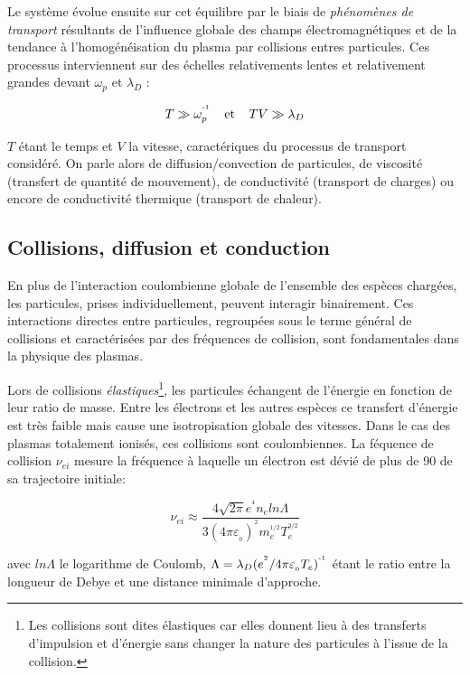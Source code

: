 Le système évolue ensuite sur cet équilibre par le biais de
\emph{phénomènes de transport} résultants de l'influence
globale des champs électromagnétiques et de la tendance à
l'homogénéisation du plasma par collisions entres particules.
Ces processus interviennent sur des échelles relativements
lentes et relativement grandes devant $\omega_p$ et $\lambda_D$ :

\begin{equation}
T\gg \omega_p^{\operatorname{^{-1}}} \;\;\;\;\text{et}\;\;\;\;T V\gg\lambda_D
\end{equation}

$T$ étant le temps et $V$ la vitesse, caractériques du processus de transport
considéré.
On parle alors de diffusion/convection de particules, de viscosité (transfert de
quantité de mouvement), de conductivité (transport de charges) ou encore de
conductivité thermique (transport de chaleur).

\subsection{Collisions, diffusion et conduction}
En plus de l'interaction coulombienne globale de l'ensemble des espèces chargées, 
les particules, prises individuellement, peuvent interagir binairement. 
Ces interactions directes entre particules, regroupées
sous le terme général de collisions et caractérisées par des fréquences de collision, 
sont fondamentales dans la physique des plasmas.

Lors de collisions \emph{élastiques}\footnote{Les collisions sont dites élastiques car
elles donnent lieu à des transferts d'impulsion et d'énergie sans changer
la nature des particules à l'issue de la collision.}, les particules échangent de l'énergie 
en fonction de leur ratio de masse. Entre les électrons et les autres espèces ce transfert 
d'énergie est très faible mais cause une isotropisation globale des vitesses.
Dans le cas des plasmas totalement ionisés, ces collisions sont coulombiennes. La féquence de 
collision $\nu_{ei}$ mesure la fréquence à laquelle un électron est dévié 
de plus de \unit{90}{\degree} de sa trajectoire initiale:

\begin{equation}
	\nu_{ei}\approx\frac{4\sqrt{2\pi}e^{^4} n_e ln\Lambda
	}{3(4\pi\varepsilon_{_0})^{^2}m_e^{^{1/2}}T_e^{^{3/2}}}
\end{equation}

avec $ln \Lambda$ le logarithme de Coulomb,
$\Lambda=\lambda_D(e^{^2}/4\pi\varepsilon_{_0}T_e)^{\operatorname{^{-1}}}$ étant le ratio
entre la longueur de Debye et une distance minimale d'approche. 

